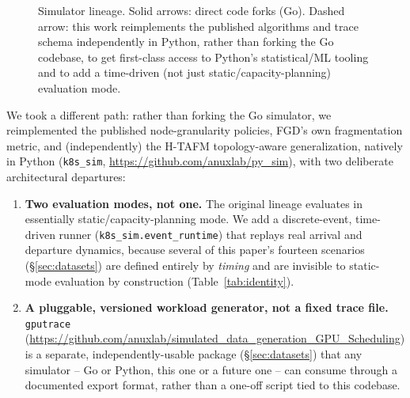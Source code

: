 \documentclass[11pt]{article}
\begin{document}
\begin{figure}[h]
\centering
{}
\caption{Simulator lineage. Solid arrows: direct code forks (Go). Dashed
arrow: this work reimplements the published algorithms and trace schema
independently in Python, rather than forking the Go codebase, to get
first-class access to Python's statistical/ML tooling and to add a
time-driven (not just static/capacity-planning) evaluation mode.}
\label{fig:sim-lineage}
\end{figure}

We took a different path: rather than forking the Go simulator, we
reimplemented the published node-granularity policies, FGD's own
fragmentation metric, and (independently) the H-TAFM topology-aware
generalization, natively in Python (\texttt{k8s\_sim},
\url{https://github.com/anuxlab/py_sim}), with two deliberate
architectural departures:

\begin{enumerate}[leftmargin=1.4em]
\item \textbf{Two evaluation modes, not one.} The original lineage
  evaluates in essentially static/capacity-planning mode. We add a
  discrete-event, time-driven runner (\texttt{k8s\_sim.event\_runtime})
  that replays real arrival and departure dynamics, because several of
  this paper's fourteen scenarios (\S\ref{sec:datasets}) are defined
  entirely by \emph{timing} and are invisible to static-mode evaluation
  by construction (Table~\ref{tab:identity}).
\item \textbf{A pluggable, versioned workload generator, not a fixed
  trace file.} \texttt{gputrace} (\url{https://github.com/anuxlab/simulated_data_generation_GPU_Scheduling})
  is a separate, independently-usable package (\S\ref{sec:datasets}) that
  any simulator -- Go or Python, this one or a future one -- can consume
  through a documented export format, rather than a one-off script tied
  to this codebase.
\end{enumerate}
\end{document}
